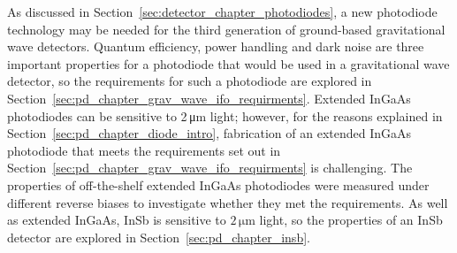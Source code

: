 As discussed in Section~\ref{sec:detector_chapter_photodiodes}, a new photodiode technology may be needed for the third generation of ground-based gravitational wave detectors. Quantum efficiency, power handling and dark noise are three important properties for a photodiode that would be used in a gravitational wave detector, so the requirements for such a photodiode are explored in Section~\ref{sec:pd_chapter_grav_wave_ifo_requirments}. Extended InGaAs photodiodes can be sensitive to 2\,\si{\micro\metre} light; however, for the reasons explained in Section~\ref{sec:pd_chapter_diode_intro}, fabrication of an extended InGaAs photodiode that meets the requirements set out in Section~\ref{sec:pd_chapter_grav_wave_ifo_requirments} is challenging. The properties of off-the-shelf extended InGaAs photodiodes were measured under different reverse biases to investigate whether they met the requirements. As well as extended InGaAs, InSb is sensitive to $2\,\si{\micro\metre}$ light, so the properties of an InSb detector are explored in Section~\ref{sec:pd_chapter_insb}.
